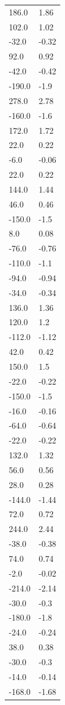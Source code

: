 \begin{longtable}{ll}
186.0 & 1.86 \\
102.0 & 1.02 \\
-32.0 & -0.32 \\
92.0 & 0.92 \\
-42.0 & -0.42 \\
-190.0 & -1.9 \\
278.0 & 2.78 \\
-160.0 & -1.6 \\
172.0 & 1.72 \\
22.0 & 0.22 \\
-6.0 & -0.06 \\
22.0 & 0.22 \\
144.0 & 1.44 \\
46.0 & 0.46 \\
-150.0 & -1.5 \\
8.0 & 0.08 \\
-76.0 & -0.76 \\
-110.0 & -1.1 \\
-94.0 & -0.94 \\
-34.0 & -0.34 \\
136.0 & 1.36 \\
120.0 & 1.2 \\
-112.0 & -1.12 \\
42.0 & 0.42 \\
150.0 & 1.5 \\
-22.0 & -0.22 \\
-150.0 & -1.5 \\
-16.0 & -0.16 \\
-64.0 & -0.64 \\
-22.0 & -0.22 \\
132.0 & 1.32 \\
56.0 & 0.56 \\
28.0 & 0.28 \\
-144.0 & -1.44 \\
72.0 & 0.72 \\
244.0 & 2.44 \\
-38.0 & -0.38 \\
74.0 & 0.74 \\
-2.0 & -0.02 \\
-214.0 & -2.14 \\
-30.0 & -0.3 \\
-180.0 & -1.8 \\
-24.0 & -0.24 \\
38.0 & 0.38 \\
-30.0 & -0.3 \\
-14.0 & -0.14 \\
-168.0 & -1.68 \\

\end{longtable}
